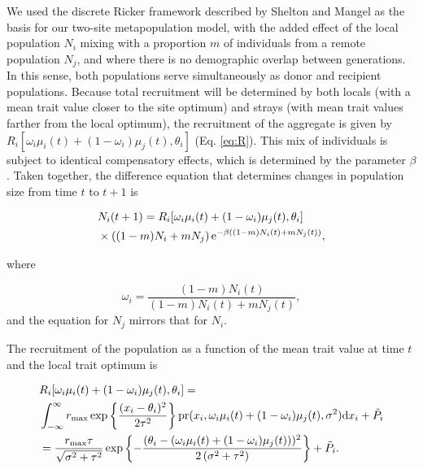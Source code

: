 \documentclass{revtex4}
\begin{document}
We used the discrete Ricker framework described by Shelton and Mangel \citep{Shelton:2011eq} as the basis for our two-site metapopulation model, with the added effect of the local population $N_i$ mixing with a proportion $m$ of individuals from a remote population $N_j$, and where there is no demographic overlap between generations.
In this sense, both populations serve simultaneously as donor and recipient populations.
Because total recruitment will be determined by both locals (with a mean trait value closer to the site optimum) and strays (with mean trait values farther from the local optimum), the recruitment of the aggregate is given by $R_i[\omega_i\mu_i(t) + (1-\omega_i)\mu_j(t),\theta_i]$ (Eq. \ref{eq:R}).
This mix of individuals is subject to identical compensatory effects, which is determined by the parameter $\beta$.
Taken together, the difference equation that determines changes in population size from time $t$ to $t+1$ is

\begin{align}
  &N_i(t+1) = R_i[\omega_i\mu_i(t) + (1-\omega_i)\mu_j(t),\theta_i] \\ \nonumber
  &\times \left((1-m)N_i + mN_j\right){\rm e}^{-\beta ((1-m)N_i(t) + m N_j(t))},
  \label{eq:N}
\end{align}

\noindent where

\begin{equation}
\omega_i=\frac{(1-m)N_i(t)}{(1-m) N_i(t) + m N_j(t)},
\end{equation} 
and the equation for $N_j$ mirrors that for $N_i$.

The recruitment of the population as a function of the mean trait value at time $t$ and the local trait optimum is

\begin{align}
  &R_i[\omega_i\mu_i(t) + (1-\omega_i)\mu_j(t),\theta_i] = \\ \nonumber
  &\int_{-\infty}^\infty r_{\rm max}\exp\left\{\frac{(x_i-\theta_i)^2}{2\tau^2}\right\} {\rm pr}(x_i,\omega_i\mu_i(t) + (1-\omega_i)\mu_j(t),\sigma^2) {\rm d}x_i +\tilde{P}_i\\ \nonumber
  &= \frac{r_{\rm max} \tau  }{\sqrt{\sigma ^2+\tau ^2}}\exp\left\{-\frac{(\theta_i-(\omega_i\mu_i(t) + (1-\omega_i)\mu_j(t)))^2}{2 \left(\sigma ^2+\tau ^2\right)}\right\} +\tilde{P}_i.
\end{align}
\end{document}
